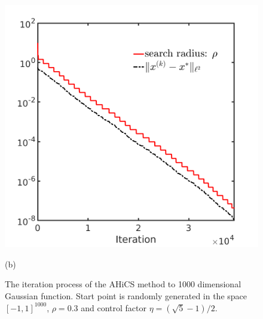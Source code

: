 \documentclass[final,1p,times]{elsarticle}
\begin{document}
\begin{figure}[!htbp]
\begin{minipage}[b]{0.5\linewidth}
{	  \includegraphics[scale=0.25]{../figures/gauss1000D_dist.png}
	  }
	\centerline{(b) }
	\end{minipage}
	  \caption{The iteration process of the AHiCS method to 1000
	  dimensional Gaussian function. 
	  Start point is randomly generated in the space $[-1,
	  1]^{1000}$, $\rho=0.3$ and control factor
	  $\eta=(\sqrt{5}-1)/2$.} 
	  \label{fig:gauss:1000D}
\end{figure}
\end{document}

